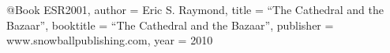 @Book
{ESR2001,
  author = {Eric S. Raymond},
  title = ``The Cathedral and the Bazaar'',
  booktitle = ``The Cathedral and the Bazaar'',
  publisher = www.snowballpublishing.com,
  year = {2010}
}